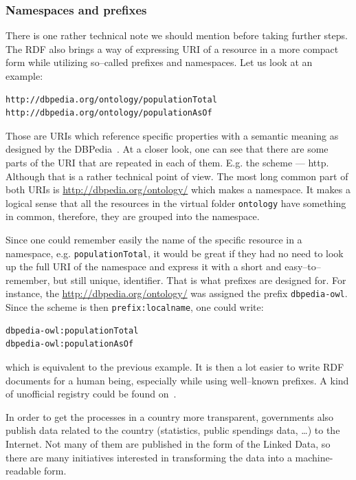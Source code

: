 \subsubsection{Namespaces and prefixes}

There is one rather technical note we should mention before taking further steps. The RDF
also brings a way of expressing URI of a resource in a more compact form while utilizing
so--called prefixes and namespaces. Let us look at an example:

\scriptsize\begin{verbatim}
http://dbpedia.org/ontology/populationTotal
http://dbpedia.org/ontology/populationAsOf
\end{verbatim}\normalsize

Those are URIs which reference specific properties with a semantic meaning as designed
by the DBPedia~\cite{dbpedia}. At a closer look, one can see that there are some parts of the URI
that are repeated in each of them. E.g. the scheme --- http. Although that is a rather technical
point of view. The most long common part of both URIs is \url{http://dbpedia.org/ontology/}
which makes a namespace. It makes a logical sense that all the resources in the virtual
folder \texttt{ontology} have something in common, therefore, they are grouped into the namespace.

Since one could remember easily the name of the specific resource in a namespace,
e.g. \texttt{populationTotal}, it would be great if they had no need to look up the full
URI of the namespace and express it with a short and easy--to--remember, but still 
unique, identifier. That is what prefixes are designed for. For instance, the
\url{http://dbpedia.org/ontology/} was assigned the prefix \texttt{dbpedia-owl}. Since the scheme
is then \texttt{prefix:localname}, one could write:

\scriptsize\begin{verbatim}
dbpedia-owl:populationTotal
dbpedia-owl:populationAsOf
\end{verbatim}\normalsize

which is equivalent to the previous example. It is then a lot easier to write RDF
documents for a human being, especially while using well--known prefixes. A kind of unofficial
registry could be found on~\cite{prefixcc}.

In order to get the processes in a country more transparent, governments also publish data
related to the country (statistics, public spendings data, …) to the Internet. Not many of
them are published in the form of the Linked Data, so there are many initiatives
interested in transforming the data into a machine-readable form.

